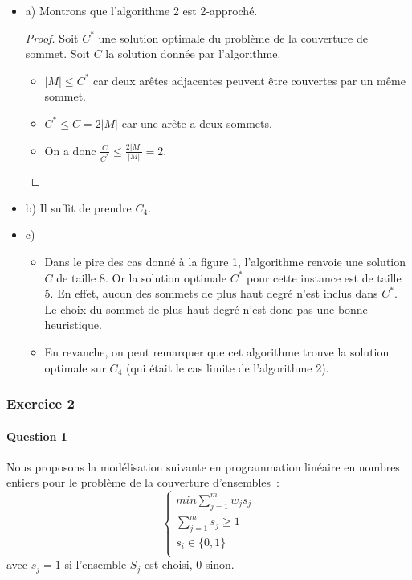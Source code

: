 \documentclass[a4paper, 12pt]{article}
\begin{document}
\begin{itemize}
\item[] a) Montrons que l'algorithme 2 est 2-approché.
\begin{proof}
Soit $C^{*}$ une solution optimale du problème de la couverture de
sommet. Soit $C$ la solution donnée par l'algorithme. 
\begin{itemize}
\item[] $|M| \leq C^{*}$ car deux arêtes adjacentes peuvent être
  couvertes par un même sommet.
\item[] $C^{*} \leq C = 2 |M|$ car une arête a deux sommets.
\item[] On a donc $\frac{C}{C^{*}} \leq \frac{2|M|}{|M|} = 2$.
\end{itemize}
\end{proof}
\item[] b) Il suffit de prendre $C_4$.
\item[] c) 
\begin{itemize}
\item[] Dans le pire des cas donné à la figure 1, l'algorithme renvoie
  une solution $C$ de taille 8. Or la solution optimale $C^*$ pour cette
  instance est de taille 5. En effet, aucun des sommets de plus haut
  degré n'est inclus dans $C^{*}$. Le choix du sommet de plus haut
  degré n'est donc pas une bonne heuristique. 
\item[] En revanche, on peut remarquer que cet algorithme trouve la
  solution optimale sur $C_4$ (qui était le cas limite de l'algorithme 2).
\end{itemize}
\end{itemize}

\subsubsection*{Exercice 2}

\paragraph{Question 1}

Nous proposons la modélisation suivante en programmation linéaire en
nombres entiers pour le problème de la couverture d'ensembles~:
\begin{equation}
\begin{cases}
min \sum_{j=1}^m w_j s_j\\
\sum_{j=1}^{m} s_{j} \geq 1 \\
s_i \in \{0,1\} \\
\end{cases}
\end{equation}
avec $s_j = 1$ si l'ensemble $S_j$ est choisi, 0 sinon.
\end{document}
